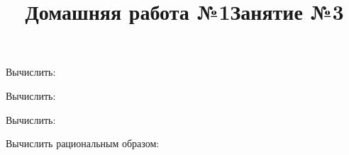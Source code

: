 \newpage
\title{Домашняя работа №1}
\begin{listofex}
	\item Вычислить:
	\begin{enumcols}[itemcolumns=2]
		\item {}
		\item {}
	\end{enumcols}
	\item Вычислить:
	\begin{enumcols}[itemcolumns=2]
		\item {}
		\item {}
	\end{enumcols}
	\item Вычислить:
	\begin{enumcols}[itemcolumns=1]
		\item {}
		\item {}
		\item {}
	\end{enumcols}
	\item Вычислить рациональным образом:
	\begin{enumcols}[itemcolumns=2]
		\item {}
		\item {}
	\end{enumcols}
	\item {}
\end{listofex}
\newpage
\title{Занятие №3}
